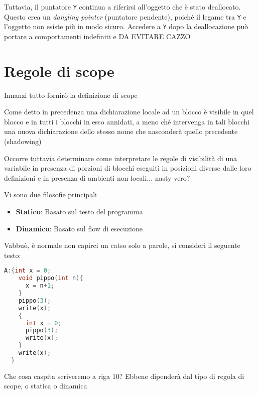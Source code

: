 \begin{itemize}
  Tuttavia, il puntatore \texttt{Y} continua a riferirsi all'oggetto  
  che è stato deallocato. Questo crea un \textit{dangling pointer} (puntatore pendente),  
  poiché il legame tra \texttt{Y} e l'oggetto non esiste più in modo sicuro.  
  Accedere a \texttt{Y} dopo la deallocazione può portare a comportamenti indefiniti e DA EVITARE CAZZO 


\end{itemize}




\section{Regole di scope}

Innanzi tutto fornirò la definizione di scope


Come detto in precedenza una dichiarazione locale ad un blocco è visibile in quel blocco e in tutti i blocchi in esso annidati, a meno ché intervenga in tali blocchi una nuova dichiarazione dello stesso nome che nasconderà quello precedente (shadowing)

Occorre tuttavia determinare come interpretare le regole di visibilità di una variabile in presenza di porzioni di blocchi eseguiti in posizioni diverse dalle loro definizioni  e in presenza di ambienti non locali... nasty vero?

Vi sono due filosofie principali
\begin{itemize}
  \item \textbf{Statico}: Basato sul testo del programma 
  \item \textbf{Dinamico}: Basato sul flow di esecuzione 
\end{itemize}

Vabbuò, è normale non capirci un catso solo a parole, si consideri il seguente testo:
\begin{lstlisting}[language=C]
  A:{int x = 0;
    void pippo(int n){
      x = n+1;
    }
    pippo(3);
    write(x);
    {
      int x = 0;
      pippo(3);
      write(x);
    }
    write(x);
  }
\end{lstlisting}
Che cosa caspita scriveremo a riga 10? Ebbene dipenderà dal tipo di regola di scope, o statica o dinamica

